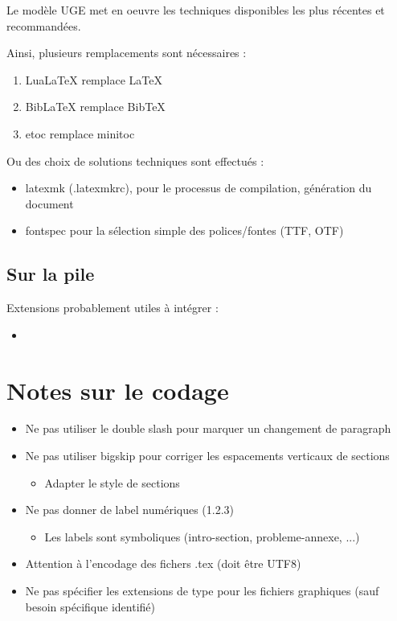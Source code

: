 Le modèle UGE met en oeuvre les techniques disponibles les plus récentes et recommandées.

Ainsi, plusieurs remplacements sont nécessaires :

\begin{enumerate}
\item LuaLaTeX remplace LaTeX
\item BibLaTeX remplace BibTeX
\item etoc remplace minitoc
\end{enumerate}

Ou des choix de solutions techniques sont effectués :
\begin{itemize}
\item latexmk (.latexmkrc), pour le processus de compilation, génération du document
\item fontspec pour la sélection simple des polices/fontes (TTF, OTF)
\end{itemize}

\subsection{Sur la pile }

Extensions probablement utiles à intégrer :

\begin{itemize}
\item {}
\end{itemize}

\section{Notes sur le codage}

\begin{itemize}
\item Ne pas utiliser le double slash pour marquer un changement de paragraph
\item Ne pas utiliser bigskip pour corriger les espacements verticaux de sections
  \begin{itemize}
  \item Adapter le style de sections
  \end{itemize}
\item Ne pas donner de label numériques (1.2.3)
  \begin{itemize}
  \item Les labels sont symboliques (intro-section, probleme-annexe, ...)
  \end{itemize}
\item Attention à l'encodage des fichers .tex (doit être UTF8)
\item Ne pas spécifier les extensions de type pour les fichiers graphiques (sauf besoin spécifique identifié)
\end{itemize}

